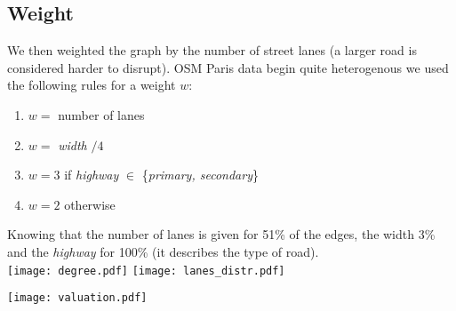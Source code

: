 \documentclass{article}
\begin{document}
\subsection{Weight}
We then weighted the graph by the number of street lanes (a larger road is considered harder to disrupt). OSM Paris data begin quite heterogenous we used the following rules for a weight $w$:
\begin{enumerate}
    \item $w =$ number of lanes
    \item $w =$ \textit{width} $/ 4$
    \item $w = 3$ if \textit{highway} $\in$ \{\textit{primary, secondary}\} \item $w = 2$ otherwise
\end{enumerate}
Knowing that the number of lanes is given for 51\% of the edges, the width 3\% and the \textit{highway} for 100\% (it describes the type of road).\\

\texttt{[image: degree.pdf]}
\texttt{[image: lanes\_distr.pdf]}
\begin{center}
    \texttt{[image: valuation.pdf]}
\end{center}
\end{document}
